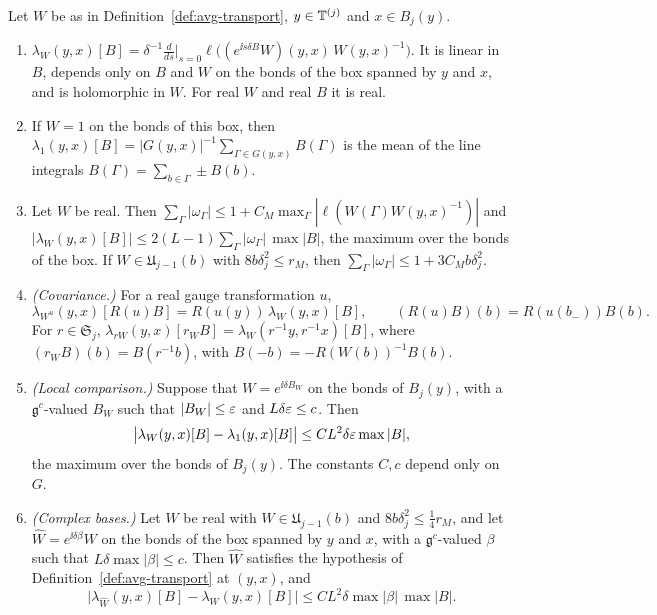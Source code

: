 \begin{lemma}\label{lem:avg-transport}
Let $W$ be as in Definition~\ref{def:avg-transport}, $y\in\mathbb T^{(j)}$ and $x\in B_j(y)$.
\begin{enumerate}[label=(\alph*)]
\item $\lambda_W(y,x)[B]=\delta^{-1}\frac{d}{ds}\big|_{s=0}\ell\big((e^{\ii s\delta B}W)(y,x)\,W(y,x)^{-1}\big)$. It is linear in $B$, depends only on $B$ and $W$ on the bonds of the box spanned by $y$ and $x$, and is holomorphic in $W$. For real $W$ and real $B$ it is real.
\item If $W=1$ on the bonds of this box, then $\lambda_1(y,x)[B]=|G(y,x)|^{-1}\sum_{\Gamma\in G(y,x)}B(\Gamma)$ is the mean of the line integrals $B(\Gamma)=\sum_{b\in\Gamma}\pm B(b)$.
\item Let $W$ be real. Then $\sum_\Gamma|\omega_\Gamma|\le1+C_M\max_\Gamma|\ell(W(\Gamma)W(y,x)^{-1})|$ and $|\lambda_W(y,x)[B]|\le2(L-1)\sum_\Gamma|\omega_\Gamma|\,\max|B|$, the maximum over the bonds of the box. If $W\in\mathfrak U_{j-1}(b)$ with $8b\delta_j^2\le r_M$, then $\sum_\Gamma|\omega_\Gamma|\le1+3C_Mb\delta_j^2$.
\item \emph{(Covariance.)} For a real gauge transformation $u$,
\[
\lambda_{W^u}(y,x)[R(u)B]=R(u(y))\,\lambda_W(y,x)[B],\qquad(R(u)B)(b)=R(u(b_-))B(b).
\]
For $r\in\mathfrak S_j$, $\lambda_{rW}(y,x)[r_WB]=\lambda_W(r^{-1}y,r^{-1}x)[B]$, where $(r_WB)(b)=B(r^{-1}b)$, with $B(-b)=-R(W(b))^{-1}B(b)$.
\item \emph{(Local comparison.)} Suppose that $W=e^{\ii\delta B_W}$ on the bonds of $B_j(y)$, with a $\mathfrak g^c$-valued $B_W$ such that $|B_W|\le\varepsilon$ and $L\delta\varepsilon\le c$. Then
\[
\big|\lambda_W(y,x)[B]-\lambda_1(y,x)[B]\big|\le CL^2\delta\varepsilon\max|B|,
\]
the maximum over the bonds of $B_j(y)$. The constants $C,c$ depend only on $G$.
\item \emph{(Complex bases.)} Let $W$ be real with $W\in\mathfrak U_{j-1}(b)$ and $8b\delta_j^2\le\frac14r_M$, and let $\hat W=e^{\ii\delta\beta}W$ on the bonds of the box spanned by $y$ and $x$, with a $\mathfrak g^c$-valued $\beta$ such that $L\delta\max|\beta|\le c$. Then $\hat W$ satisfies the hypothesis of Definition~\ref{def:avg-transport} at $(y,x)$, and
\[
\big|\lambda_{\hat W}(y,x)[B]-\lambda_W(y,x)[B]\big|\le CL^2\delta\max|\beta|\,\max|B| .
\]
\end{enumerate}
\end{lemma}

